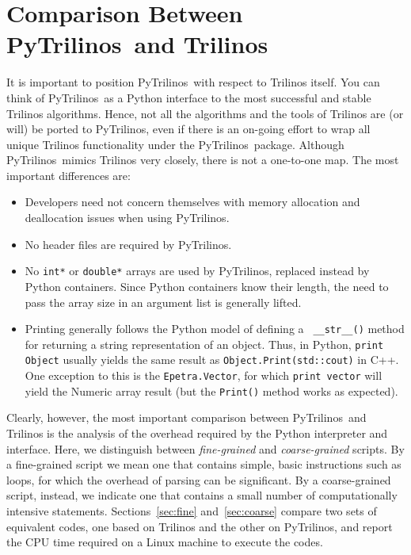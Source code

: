 \documentclass[acmtocl]{acmtrans2m}
\newcommand{\PyTrilinos}{{PyTrilinos}}
\begin{document}
\section{Comparison Between \PyTrilinos\ and Trilinos}
\label{sec:comparison_trilinos}

It is important to position \PyTrilinos\ with respect to Trilinos
itself.  You can think of \PyTrilinos\ as a Python interface to the
most successful and stable Trilinos algorithms.  Hence, not all the
algorithms and the tools of Trilinos are (or will) be ported to
\PyTrilinos, even if there is an on-going effort to wrap all unique
Trilinos functionality under the \PyTrilinos\ package.  Although
\PyTrilinos\ mimics Trilinos very closely, there is not a one-to-one
map.  The most important differences are:

\begin{itemize}

\item Developers need not concern themselves with memory allocation
  and deallocation issues when using \PyTrilinos.

\item No header files are required by \PyTrilinos.

\item No {\tt int*} or {\tt double*} arrays are used by \PyTrilinos,
  replaced instead by Python containers.  Since Python containers know
  their length, the need to pass the array size in an argument list is
  generally lifted.

\item Printing generally follows the Python model of defining a {\tt
  \_\_str\_\_()} method for returning a string representation of an
  object.  Thus, in Python, {\tt print Object} usually yields the same
  result as {\tt Object.Print(std::cout)} in C++.  One exception to
  this is the {\tt Epetra.Vector}, for which {\tt print vector} will
  yield the Numeric array result (but the {\tt Print()} method works
  as expected).

\end{itemize}

Clearly, however, the most important comparison between
\PyTrilinos\ and Trilinos is the analysis of the overhead required by
the Python interpreter and interface.  Here, we distinguish between
{\sl fine-grained} and {\sl coarse-grained} scripts.  By a
fine-grained script we mean one that contains simple, basic
instructions such as loops, for which the overhead of parsing can be
significant.  By a coarse-grained script, instead, we indicate one
that contains a small number of computationally intensive statements.
Sections~\ref{sec:fine} and~\ref{sec:coarse} compare two sets of
equivalent codes, one based on Trilinos and the other on \PyTrilinos,
and report the CPU time required on a Linux machine to execute the
codes.
\end{document}
